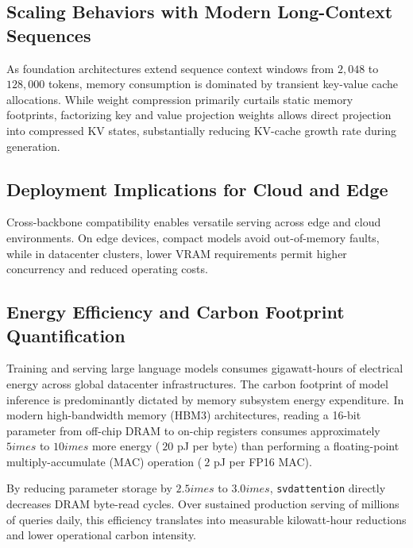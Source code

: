 \subsection{Scaling Behaviors with Modern Long-Context Sequences}
As foundation architectures extend sequence context windows from $2{,}048$ to $128{,}000$ tokens, memory consumption is dominated by transient key-value cache allocations. While weight compression primarily curtails static memory footprints, factorizing key and value projection weights allows direct projection into compressed KV states, substantially reducing KV-cache growth rate during generation.

\subsection{Deployment Implications for Cloud and Edge}
Cross-backbone compatibility enables versatile serving across edge and cloud environments. On edge devices, compact models avoid out-of-memory faults, while in datacenter clusters, lower VRAM requirements permit higher concurrency and reduced operating costs.

\subsection{Energy Efficiency and Carbon Footprint Quantification}
Training and serving large language models consumes gigawatt-hours of electrical energy across global datacenter infrastructures. The carbon footprint of model inference is predominantly dictated by memory subsystem energy expenditure. In modern high-bandwidth memory (HBM3) architectures, reading a 16-bit parameter from off-chip DRAM to on-chip registers consumes approximately $5	imes$ to $10	imes$ more energy ($~20$ pJ per byte) than performing a floating-point multiply-accumulate (MAC) operation ($~2$ pJ per FP16 MAC).

By reducing parameter storage by $2.5	imes$ to $3.0	imes$, \texttt{svdattention} directly decreases DRAM byte-read cycles. Over sustained production serving of millions of queries daily, this efficiency translates into measurable kilowatt-hour reductions and lower operational carbon intensity.
